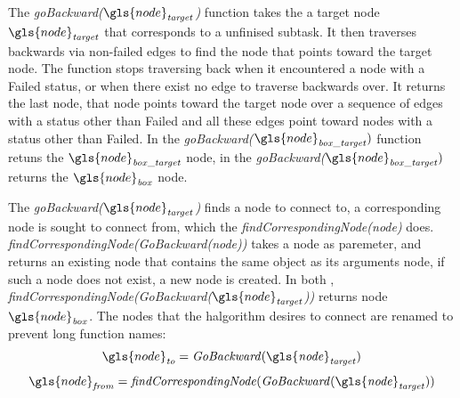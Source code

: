  The \textit{goBackward($\gls{node}_\mathit{target}$)} function takes the a target node $\gls{node}_\mathit{target}$ that corresponds to a unfinised subtask. It then traverses backwards via non-failed edges to find the node that points toward the target node. The function stops traversing back when it encountered a node with a Failed status, or when there exist no edge to traverse backwards over. It returns the last node, that node points toward the target node over a sequence of edges with a status other than Failed and all these edges point toward nodes with a status other than Failed. In  the \textit{goBackward($\gls{node}_\mathit{box\_target})$} function retuns the $\gls{node}_\mathit{box\_target}$ node, in  the \textit{goBackward($\gls{node}_\mathit{box\_target})$} returns the $\gls{node}_\mathit{box}$ node.\bs

The \textit{goBackward($\gls{node}_\mathit{target}$)} finds a node to connect to, a corresponding node is sought to connect from, which the \textit{findCorrespondingNode(\gls{node})} does. \textit{findCorrespondingNode(GoBackward(\gls{node}))} takes a node as paremeter, and returns an existing node that contains the same object as its arguments node, if such a node does not exist, a new node is created. In both , \textit{findCorrespondingNode(GoBackward($\gls{node}_\mathit{target}$))} returns node $\gls{node}_\mathit{box}$. The nodes that the \ac{halgorithm} desires to connect are renamed to prevent long function names: 
\[\gls{node}_\mathit{to} =  \mathit{GoBackward(\gls{node}_\mathit{target})}\]
\[\gls{node}_\mathit{from} = \mathit{findCorrespondingNode(GoBackward(\gls{node}_\mathit{target}))}\]

